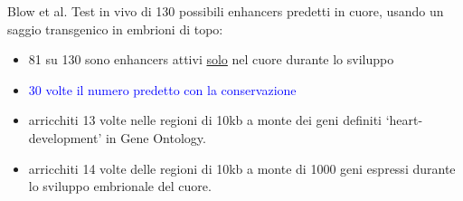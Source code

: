 \documentclass{beamer}
\newcommand{\warn}[1]{\textcolor{blue}{#1}}
\begin{document}
    \begin{frame}{Blow et al.}
        Test in vivo di 130 possibili enhancers predetti in cuore,
        usando un saggio transgenico in embrioni di topo:
        \begin{itemize}
            \item 81 su 130 sono enhancers attivi \underline{solo} nel cuore durante lo sviluppo
            \item \warn{30 volte il numero predetto con la conservazione}
            \item arricchiti 13 volte nelle regioni di 10kb a monte dei geni definiti
            `heart-development' in Gene Ontology.
            \item arricchiti 14 volte delle regioni di 10kb a monte di 1000 geni espressi
            durante lo sviluppo embrionale del cuore.
        \end{itemize}
    \end{frame}
\end{document}
